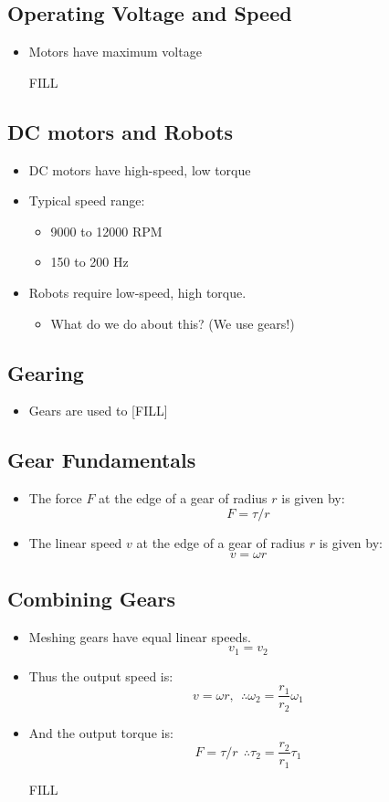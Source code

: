 \documentclass[10pt]{article}
\begin{document}
\subsection*{Operating Voltage and Speed}
\begin{itemize}
	\item Motors have maximum voltage
	\item [FILL]
\end{itemize}

\subsection*{DC motors and Robots}
\begin{itemize}
	\item DC motors have high-speed, low torque
	\item Typical speed range:
	\begin{itemize}
        \item 9000 to 12000 RPM
        \item 150 to 200 Hz
    \end{itemize}
    \item Robots require low-speed, high torque.  
    \begin{itemize}
        \item What do we do about this? (We use gears!)
    \end{itemize}
\end{itemize}

\subsection*{Gearing}
\begin{itemize}
	\item Gears are used to [FILL]
\end{itemize}

\subsection*{Gear Fundamentals}
\begin{itemize}
	\item The force $F$ at the edge of a gear of radius $r$ is given by:
	\[F = \tau / r\]
    \item The linear speed $v$ at the edge of a gear of radius $r$ is given by:
    \[v = \omega r\]
\end{itemize}

\subsection*{Combining Gears}
\begin{itemize}
	\item Meshing gears have equal linear speeds.
	\[v_1 = v_2\]
    \item Thus the output speed is:
    \[v = \omega r, \:\:\therefore \omega_2 = \frac{r_1}{r_2} \omega_1\]
    \item And the output torque is:
    \[F = \tau / r \:\:\therefore \tau_2 = \frac{r_2}{r_1}\tau_1\]
    \item [FILL]
\end{itemize}
\end{document}
